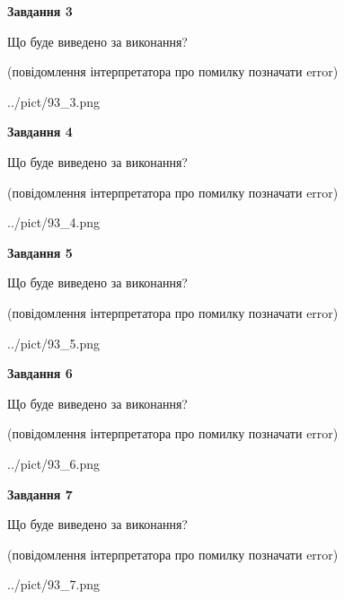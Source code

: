 \documentclass[12pt, ukrainian]{article}
\begin{document}
{\begin {large}
{\begin {center}\textbf{Завдання 3}\end {center}}\par
Що буде виведено за виконання?\par
 (повідомлення інтерпретатора про помилку позначати error)\par
\begin{center}
	{../pict/93_3.png}
\end{center}
\newpage

{\begin {center}\textbf{Завдання 4}\end {center}}\par
Що буде виведено за виконання?\par
 (повідомлення інтерпретатора про помилку позначати error)\par
\begin{center}
	{../pict/93_4.png}
\end{center}
\newpage

{\begin {center}\textbf{Завдання 5}\end {center}}\par
Що буде виведено за виконання?\par
 (повідомлення інтерпретатора про помилку позначати error)\par
\begin{center}
	{../pict/93_5.png}
\end{center}
\newpage

{\begin {center}\textbf{Завдання 6}\end {center}}\par
Що буде виведено за виконання?\par
 (повідомлення інтерпретатора про помилку позначати error)\par
\begin{center}
	{../pict/93_6.png}
\end{center}
\newpage

{\begin {center}\textbf{Завдання 7}\end {center}}\par
Що буде виведено за виконання?\par
 (повідомлення інтерпретатора про помилку позначати error)\par
\begin{center}
	{../pict/93_7.png}
\end{center}
\newpage


\end{large}}
\end{document}

